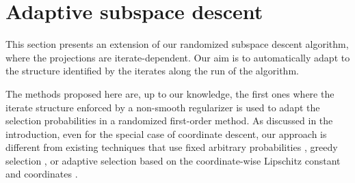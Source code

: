 \section{Adaptive subspace descent}
\label{sec:mor-adaptive-subspace}

{This section presents an extension of our randomized subspace descent algorithm, where the projections are iterate-dependent. %
Our aim is to automatically adapt to the structure identified by the iterates along the run of the algorithm.

The methods proposed here are, up to our knowledge, the first ones where the iterate structure enforced by a non-smooth regularizer is used to adapt the selection probabilities in a randomized first-order method. As discussed in the introduction, even for the special case of coordinate descent, our approach is different from existing techniques that use fixed arbitrary probabilities \cite{richtarik2014iteration,necoara2014random}, greedy selection \cite{dhillon2011nearest,nutini2015coordinate,nutini2017let}, or adaptive selection 
based on the coordinate-wise Lipschitz constant and coordinates \cite{perekrestenko2017faster,namkoong2017adaptive,stich2017safe}. 





}
